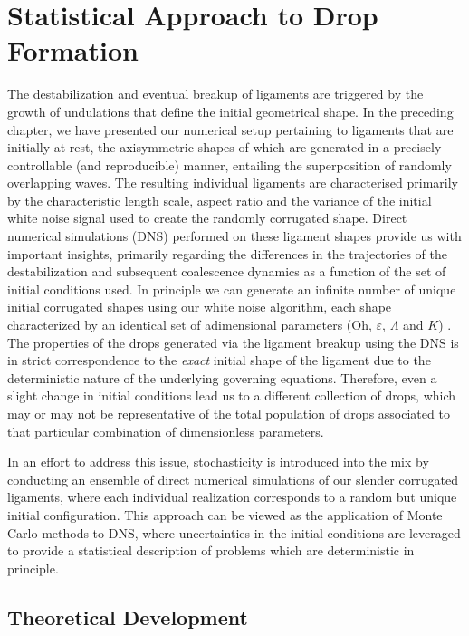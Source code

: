 \setchapterpreamble[u]{\margintoc}
\chapter{Statistical Approach to Drop Formation}

%


The destabilization and eventual breakup of ligaments are triggered 
by the growth of undulations that define the initial geometrical shape. 
In the preceding chapter, we have presented our numerical setup pertaining to 
ligaments that are initially at rest, the axisymmetric shapes of which 
are generated in a precisely controllable (and reproducible) manner, 
entailing the superposition of randomly overlapping waves. 
The resulting individual ligaments are characterised primarily 
by the characteristic length scale, aspect ratio and the variance of 
the initial white noise signal used to create the randomly corrugated shape.
Direct numerical simulations (DNS) performed on these ligament shapes 
provide us with important insights, primarily regarding the differences in the 
trajectories of the destabilization and subsequent coalescence dynamics
as a function of the set of initial conditions used. 
In principle we can generate an infinite number of unique initial corrugated shapes 
using our white noise algorithm, each shape characterized by an identical set 
of adimensional parameters ($\textrm{Oh}$, $\varepsilon$, $\Lambda$ and $K$) .
The properties of the drops generated via the ligament breakup 
using the DNS is in strict correspondence to the \textit{exact} initial shape 
of the ligament due to the deterministic nature of the underlying governing equations. 
Therefore, even a slight change in initial conditions lead us to a different collection 
of drops, which may or may not be representative of the total population of drops associated to 
that particular combination of dimensionless parameters. 

In an effort to address this issue, stochasticity is introduced into
the mix by conducting an ensemble of direct numerical simulations of our 
slender corrugated ligaments, where each individual realization corresponds
to a random but unique initial configuration. 
This approach can be viewed as the application of Monte Carlo methods to DNS, 
where uncertainties in the initial conditions are leveraged to provide a statistical 
description of problems which are deterministic in principle. 

\section{Theoretical Development}

